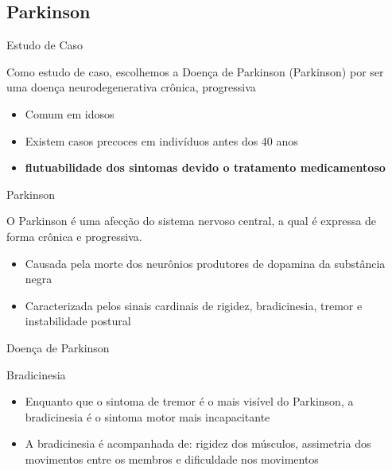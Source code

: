 \documentclass{beamer}
\begin{document}
\subsection{Parkinson}
\begin{frame}{Estudo de Caso}
  \begin{block}{}
   Como estudo de caso, escolhemos a Doença de Parkinson (Parkinson) por ser uma doença neurodegenerativa crônica, progressiva 
   \begin{itemize}
    \item Comum em idosos
    \item Existem casos precoces em indivíduos antes dos 40 anos
    \item \textbf{flutuabilidade dos sintomas devido o tratamento medicamentoso}
   \end{itemize}
  \end{block}
\end{frame}


\begin{frame}{Parkinson}
  \begin{block}{}
    O Parkinson é uma afecção do sistema nervoso central, a qual é expressa de forma crônica e progressiva. 
      \begin{itemize}
       \item Causada pela morte dos neurônios produtores de dopamina da substância negra~\cite{protpar010}
       \item Caracterizada pelos sinais cardinais de rigidez, bradicinesia, tremor e instabilidade postural~\cite{jankovic2008}
      \end{itemize}
  \end{block}
\end{frame}


\begin{frame}{Doença de Parkinson}
  \begin{block}{Bradicinesia}
      \begin{itemize}
	\item Enquanto que o sintoma de tremor é o mais visível do Parkinson, a bradicinesia é o sintoma motor mais incapacitante
	\item A bradicinesia é acompanhada de: rigidez dos músculos, assimetria dos movimentos entre os membros e dificuldade nos movimentos
	\end{itemize}
  \end{block}
\end{frame}
  
\end{document}
